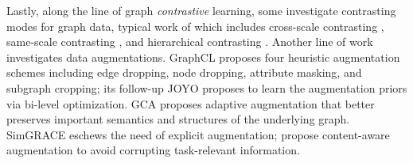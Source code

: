 Lastly, along the line of graph \emph{contrastive} learning, some investigate contrasting modes for graph data, typical work of which includes cross-scale contrasting \cite{Velickovic:2019tu,Hassani:2020un}, same-scale contrasting \cite{Sun:2020vi,Zhu:2020vf,You:2020ut}, and hierarchical contrasting \cite{Xu:2021tv,Lin:2021vt}.
Another line of work investigates data augmentations.
GraphCL \cite{You:2020ut} proposes four heuristic augmentation schemes including edge dropping, node dropping, attribute masking, and subgraph cropping; its follow-up JOYO \cite{You:2021wl} proposes to learn the augmentation priors via bi-level optimization.
GCA \cite{Zhu:2021gx} proposes adaptive augmentation that better preserves important semantics and structures of the underlying graph.
SimGRACE \cite{Xia:2022gd} eschews the need of explicit augmentation;
\citet{Trivedi:2022de} propose content-aware augmentation to avoid corrupting task-relevant information.
